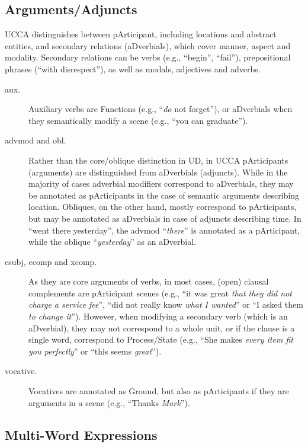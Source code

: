 \documentclass[11pt,a4paper]{article}
\begin{document}
\subsection{Arguments/Adjuncts}\label{sec:arguments}

      UCCA distinguishes between pArticipant,
      including locations and abstract entities,
      and secondary relations (aDverbials), 
      which cover manner, aspect and modality.
      Secondary relations can be verbs (e.g., ``begin'', ``fail''),
      prepositional phrases (``with disrespect''),
      as well as modals, adjectives and adverbs.
\begin{description}
	\item[aux.]
	Auxiliary verbs are Functions (e.g., ``\textit{do} not forget''),
	or aDverbials when they semantically modify a scene (e.g., ``you can graduate'').
	\item[advmod and obl.]
	Rather than the core/oblique distinction in UD,
	in UCCA pArticipants (arguments) are distinguished from aDverbials (adjuncts).
	While in the majority of cases adverbial modifiers correspond to aDverbials,
	they may be annotated as pArticipants in the case of semantic arguments describing location.
	Obliques, on the other hand, mostly correspond to pArticipants, but may be
	annotated as aDverbials in case of adjuncts describing time.
	In ``went there yesterday'', the advmod ``\textit{there}'' is annotated as a pArticipant,
	while the oblique ``\textit{yesterday}'' as an aDverbial.
	\item[csubj, ccomp and xcomp.]
	As they are core arguments of verbs,
	in most cases, (open) clausal complements are pArticipant scenes
	(e.g., ``it was great \textit{that they did not charge a service fee}'',
	``did not really know \textit{what I wanted}'' or
	``I asked them \textit{to change it}'').
	However, when modifying a secondary verb (which is an aDverbial),
	they may not correspond to a whole unit, or if the clause is a single word,
	correspond to Process/State
	(e.g., ``She makes \textit{every item fit you perfectly}'' or
	``this seems \textit{great}'').
	\item[vocative.]
	Vocatives are annotated as Ground,
	but also as pArticipants if they are arguments in a scene
	(e.g., ``Thanks \textit{Mark}'').
\end{description}	
	

\subsection{Multi-Word Expressions}\label{sec:mwe}
\end{document}
